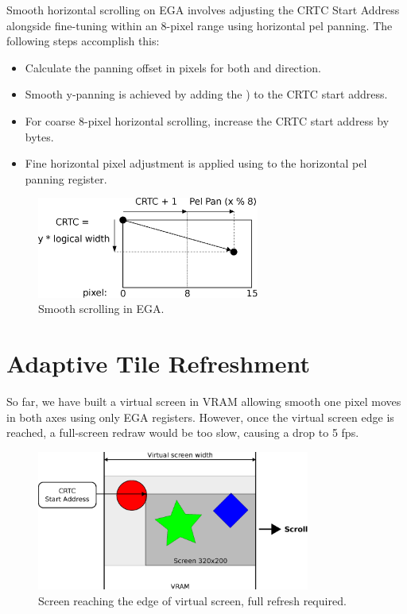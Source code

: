 \documentclass[book.tex]{subfiles}
\begin{document}
\begin{minipage}{\textwidth}
  
  \end{minipage}
  \label{ega_pel_pan}
 
\par
Smooth horizontal scrolling on EGA involves adjusting the CRTC Start Address alongside fine-tuning within an 8-pixel range using horizontal pel panning. The following steps accomplish this:
\begin{itemize}
  \item Calculate the panning offset in pixels for both  and direction.
  \item Smooth y-panning is achieved by adding the ) to the CRTC start address.
  \item For coarse 8-pixel horizontal scrolling, increase the CRTC start address by  bytes.
  \item Fine horizontal pixel adjustment is applied using  to the horizontal pel panning register.
\end{itemize}


\begin{figure}[H]
\centering
\includegraphics[width=0.65\textwidth]{imgs/drawings/Tile_Refresh.eps}
\caption{Smooth scrolling in EGA.}
\label{fig:tile_refresh}
\end{figure}


\section{Adaptive Tile Refreshment}
So far, we have built a virtual screen in VRAM allowing smooth one pixel moves in both axes using only EGA registers. However, once the virtual screen edge is reached, a full-screen redraw would be too slow, causing a drop to 5 fps.\\


\begin{figure}[H]
\centering
\includegraphics[width=0.8\textwidth]{imgs/drawings/screen_edge.eps}
\caption{Screen reaching the edge of virtual screen, full refresh required.}
\label{fig:screen_edge}
\end{figure}
\end{document}
